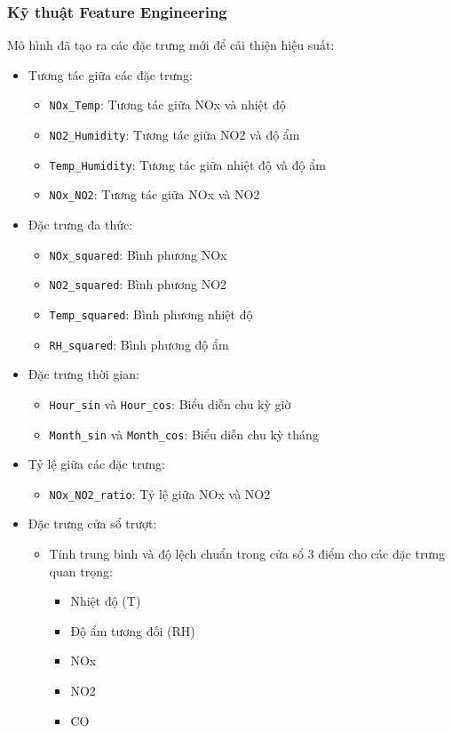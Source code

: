 \subsubsection{Kỹ thuật Feature Engineering}
Mô hình đã tạo ra các đặc trưng mới để cải thiện hiệu suất:
\begin{itemize}
    \item Tương tác giữa các đặc trưng:
    \begin{itemize}
        \item \texttt{NOx\_Temp}: Tương tác giữa NOx và nhiệt độ
        \item \texttt{NO2\_Humidity}: Tương tác giữa NO2 và độ ẩm
        \item \texttt{Temp\_Humidity}: Tương tác giữa nhiệt độ và độ ẩm
        \item \texttt{NOx\_NO2}: Tương tác giữa NOx và NO2
    \end{itemize}
    \item Đặc trưng đa thức:
    \begin{itemize}
        \item \texttt{NOx\_squared}: Bình phương NOx
        \item \texttt{NO2\_squared}: Bình phương NO2
        \item \texttt{Temp\_squared}: Bình phương nhiệt độ
        \item \texttt{RH\_squared}: Bình phương độ ẩm
    \end{itemize}
    \item Đặc trưng thời gian:
    \begin{itemize}
        \item \texttt{Hour\_sin} và \texttt{Hour\_cos}: Biểu diễn chu kỳ giờ
        \item \texttt{Month\_sin} và \texttt{Month\_cos}: Biểu diễn chu kỳ tháng
    \end{itemize}
    \item Tỷ lệ giữa các đặc trưng:
    \begin{itemize}
        \item \texttt{NOx\_NO2\_ratio}: Tỷ lệ giữa NOx và NO2
    \end{itemize}
    \item Đặc trưng cửa sổ trượt:
    \begin{itemize}
        \item Tính trung bình và độ lệch chuẩn trong cửa sổ 3 điểm cho các đặc trưng quan trọng:
        \begin{itemize}
            \item Nhiệt độ (T)
            \item Độ ẩm tương đối (RH)
            \item NOx
            \item NO2
            \item CO
        \end{itemize}
    \end{itemize}
\end{itemize}


